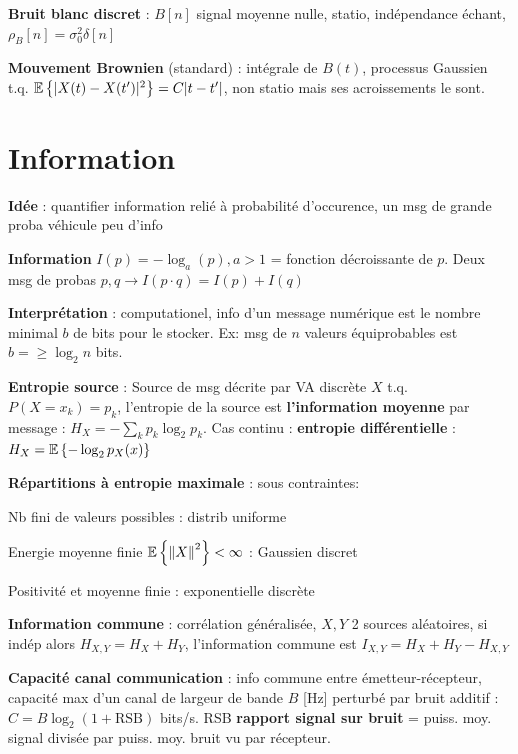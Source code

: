 \textbf{Bruit blanc discret} : $B[n]$ signal moyenne nulle, statio, indépendance échant, $\rho_B[n]=\sigma_0^2\delta[n]$

\textbf{Mouvement Brownien} (standard) : intégrale de $B(t)$, processus Gaussien t.q. $\mathbb{E}\left\{|X(t)-X(t')|^2\right\}=C|t-t'|$, non statio mais ses acroissements le sont.


\section{Information}

\textbf{Idée} : quantifier information relié à probabilité d'occurence, un msg de grande proba véhicule peu d'info 

\textbf{Information} $I(p) = -\log_a(p), a>1$ = fonction décroissante de $p$. Deux msg de probas $p,q \rightarrow I(p\cdot q) = I(p)+I(q)$  

\textbf{Interprétation} : computationel, info d'un message numérique est le nombre minimal $b$ de bits pour le stocker. Ex: msg de $n$ valeurs équiprobables est $b=\geq{\log_2n}$ bits. 

\textbf{Entropie source} : Source de msg décrite par VA discrète $X$ t.q. $P(X=x_k)=p_k$, l'entropie de la source est \textbf{l'information moyenne} par message : $H_X = -\sum_k p_k \log_2p_k$. Cas continu : \textbf{entropie différentielle} : $H_X = \mathbb{E}\left\{-\log_2p_X(x)\right\}$

\textbf{Répartitions à entropie maximale} : sous contraintes: 
\begin{myitemize}
    \item Nb fini de valeurs possibles : distrib uniforme
    \item Energie moyenne finie $\mathbb{E}\left\{\left\lVert X\right\rVert^2\right\} < \infty$ : Gaussien discret
    \item Positivité et moyenne finie : exponentielle discrète
\end{myitemize}

\textbf{Information commune} : corrélation généralisée, $X,Y$ 2 sources aléatoires, si indép alors $H_{X,Y}=H_X+H_Y$, l'information commune est $I_{X,Y} = H_X+H_Y-H_{X,Y}$

\textbf{Capacité canal communication} : info commune entre émetteur-récepteur, capacité max d'un canal de largeur de bande $B$ [Hz] perturbé par bruit additif : $C = B\log_2(1+\text{RSB})$ bits/s. RSB \textbf{rapport signal sur bruit} = puiss. moy. signal divisée par puiss. moy. bruit vu par récepteur. 


